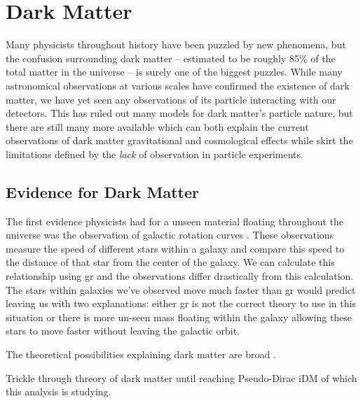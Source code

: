 \chapter{Dark Matter}
\label{chapter:dm}

Many physicists throughout history have been puzzled by new phenomena, but the
confusion surrounding dark matter -- estimated to be roughly 85\% of the total
matter in the universe -- is surely one of the biggest puzzles. While many
astronomical observations at various scales have confirmed the existence of
dark matter, we have yet seen any observations of its particle interacting
with our detectors. This has ruled out many models for dark matter's particle
nature, but there are still many more available which can both explain the
current observations of dark matter gravitational and cosmological effects
while skirt the limitations defined by the \emph{lack} of observation in
particle experiments.

\section{Evidence for Dark Matter}

The first evidence physicists had for a unseen material floating throughout the universe
was the observation of galactic rotation curves \cite{rubin-rotationcurve-1980,rotationcurve-2000}.
These observations measure the speed of different stars within a galaxy and compare this speed to
the distance of that star from the center of the galaxy. We can calculate this relationship
using \gls{gr}  and the
observations differ drastically from this calculation. The stars within galaxies we've observed move
much faster than \gls{gr} would predict leaving us with two explanations: either \gls{gr} is not the correct theory
to use in this situation or there is more un-seen mass floating within the galaxy allowing these stars
to move faster without leaving the galactic orbit.

The theoretical possibilities explaining dark matter are broad \cite{darksectors-2016}.

Trickle through threory of dark matter until reaching Pseudo-Dirac iDM of which
this analysis is studying.

